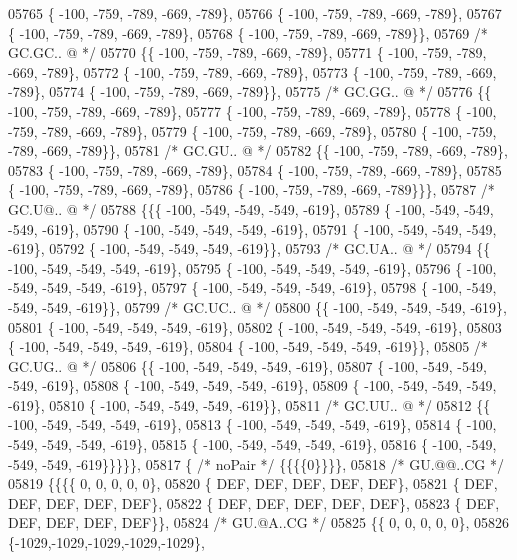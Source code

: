 \begin{DoxyCode}
05765 \{ -100, -759, -789, -669, -789\},
05766 \{ -100, -759, -789, -669, -789\},
05767 \{ -100, -759, -789, -669, -789\},
05768 \{ -100, -759, -789, -669, -789\}\},
05769 \textcolor{comment}{/* GC.GC.. @ */}
05770 \{\{ -100, -759, -789, -669, -789\},
05771 \{ -100, -759, -789, -669, -789\},
05772 \{ -100, -759, -789, -669, -789\},
05773 \{ -100, -759, -789, -669, -789\},
05774 \{ -100, -759, -789, -669, -789\}\},
05775 \textcolor{comment}{/* GC.GG.. @ */}
05776 \{\{ -100, -759, -789, -669, -789\},
05777 \{ -100, -759, -789, -669, -789\},
05778 \{ -100, -759, -789, -669, -789\},
05779 \{ -100, -759, -789, -669, -789\},
05780 \{ -100, -759, -789, -669, -789\}\},
05781 \textcolor{comment}{/* GC.GU.. @ */}
05782 \{\{ -100, -759, -789, -669, -789\},
05783 \{ -100, -759, -789, -669, -789\},
05784 \{ -100, -759, -789, -669, -789\},
05785 \{ -100, -759, -789, -669, -789\},
05786 \{ -100, -759, -789, -669, -789\}\}\},
05787 \textcolor{comment}{/* GC.U@.. @ */}
05788 \{\{\{ -100, -549, -549, -549, -619\},
05789 \{ -100, -549, -549, -549, -619\},
05790 \{ -100, -549, -549, -549, -619\},
05791 \{ -100, -549, -549, -549, -619\},
05792 \{ -100, -549, -549, -549, -619\}\},
05793 \textcolor{comment}{/* GC.UA.. @ */}
05794 \{\{ -100, -549, -549, -549, -619\},
05795 \{ -100, -549, -549, -549, -619\},
05796 \{ -100, -549, -549, -549, -619\},
05797 \{ -100, -549, -549, -549, -619\},
05798 \{ -100, -549, -549, -549, -619\}\},
05799 \textcolor{comment}{/* GC.UC.. @ */}
05800 \{\{ -100, -549, -549, -549, -619\},
05801 \{ -100, -549, -549, -549, -619\},
05802 \{ -100, -549, -549, -549, -619\},
05803 \{ -100, -549, -549, -549, -619\},
05804 \{ -100, -549, -549, -549, -619\}\},
05805 \textcolor{comment}{/* GC.UG.. @ */}
05806 \{\{ -100, -549, -549, -549, -619\},
05807 \{ -100, -549, -549, -549, -619\},
05808 \{ -100, -549, -549, -549, -619\},
05809 \{ -100, -549, -549, -549, -619\},
05810 \{ -100, -549, -549, -549, -619\}\},
05811 \textcolor{comment}{/* GC.UU.. @ */}
05812 \{\{ -100, -549, -549, -549, -619\},
05813 \{ -100, -549, -549, -549, -619\},
05814 \{ -100, -549, -549, -549, -619\},
05815 \{ -100, -549, -549, -549, -619\},
05816 \{ -100, -549, -549, -549, -619\}\}\}\}\},
05817 \{ \textcolor{comment}{/* noPair */} \{\{\{\{0\}\}\}\},
05818 \textcolor{comment}{/* GU.@@..CG */}
05819 \{\{\{\{    0,    0,    0,    0,    0\},
05820 \{  DEF,  DEF,  DEF,  DEF,  DEF\},
05821 \{  DEF,  DEF,  DEF,  DEF,  DEF\},
05822 \{  DEF,  DEF,  DEF,  DEF,  DEF\},
05823 \{  DEF,  DEF,  DEF,  DEF,  DEF\}\},
05824 \textcolor{comment}{/* GU.@A..CG */}
05825 \{\{    0,    0,    0,    0,    0\},
05826 \{-1029,-1029,-1029,-1029,-1029\},

\end{DoxyCode}
